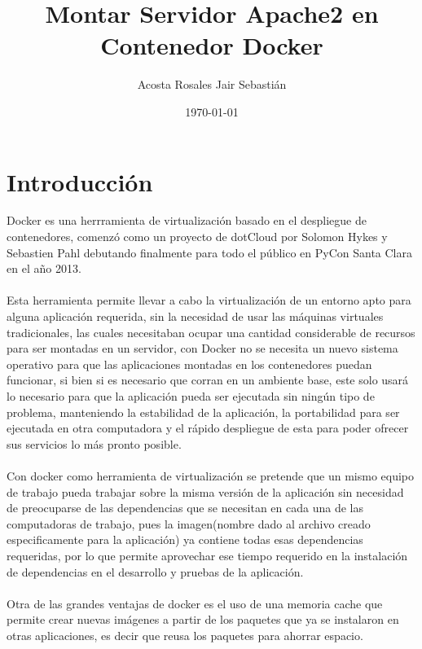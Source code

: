 \documentclass[10pt,letterpaper]{article}
\begin{document}
\title{Montar Servidor Apache2 en Contenedor Docker}
\author{Acosta Rosales Jair Sebasti\'an}
\date{\today}
\maketitle

\section{Introducci\'on}

Docker es una herrramienta de virtualizaci\'on basado en el despliegue de contenedores, comenz\'o como un proyecto de dotCloud por Solomon Hykes y Sebastien Pahl debutando finalmente para todo el p\'ublico en PyCon Santa Clara en el a\~no 2013.\\ \\

Esta herramienta permite llevar a cabo la virtualizaci\'on de un entorno apto para alguna aplicaci\'on requerida, sin la necesidad de usar las m\'aquinas virtuales tradicionales, las cuales necesitaban ocupar una cantidad considerable de recursos para ser montadas en un servidor, con Docker no se necesita un nuevo sistema operativo para que las aplicaciones montadas en los contenedores puedan funcionar, si bien si es necesario que corran en un ambiente base, este solo usar\'a lo necesario para que la aplicaci\'on pueda ser ejecutada sin ning\'un tipo de problema, manteniendo la estabilidad de la aplicaci\'on, la portabilidad para ser ejecutada en otra computadora y el r\'apido despliegue de esta para poder ofrecer sus servicios lo m\'as pronto posible. \\ \\

Con docker como herramienta de virtualizaci\'on se pretende que un mismo equipo de trabajo pueda trabajar sobre la misma versi\'on de la aplicaci\'on sin necesidad de preocuparse de las dependencias que se necesitan en cada una de las computadoras de trabajo, pues la imagen(nombre dado al archivo creado especificamente para la aplicaci\'on) ya contiene todas esas dependencias requeridas, por lo que permite aprovechar ese tiempo requerido en la instalaci\'on de dependencias en el desarrollo y pruebas de la aplicaci\'on. \\ \\ 

Otra de las grandes ventajas de docker es el uso de una memoria cache que permite crear nuevas im\'agenes a partir de los paquetes que ya se instalaron en otras aplicaciones, es decir que reusa los paquetes para ahorrar espacio. \\ \\
\end{document}

